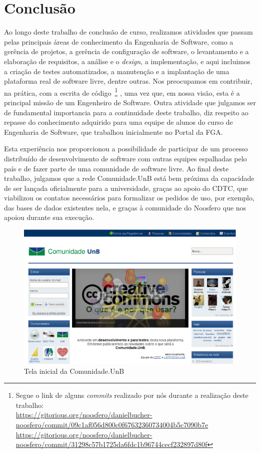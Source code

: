 \chapter{Conclusão}
\label{cap:conclusao}

Ao longo deste trabalho de conclusão de curso, realizamos atividades que passam
pelas principais áreas de conhecimento da Engenharia de Software, como a
gerência de projetos, a gerência de configuração de software,
o levantamento e a elaboração de requisitos, a análise e o \textit{design},
a implementação, e aqui incluimos a criação de testes automatizados,
a manutenção e a implantação de uma plataforma real de software livre, dentre
outras.
%
Nos preocupamos em contribuir, na prática, com a escrita de código~\footnote{%
Segue o link de alguns \textit{commits} realizado por nós durante a realização
deste trabalho: \\
\url{https://gitorious.org/noosfero/danielbucher-noosfero/commit/09c1af056d800c0f67632360734004b5c7090b7e}\\
\url{https://gitorious.org/noosfero/danielbucher-noosfero/commit/31298c57b1725da6fdc1b96744cecf232897d80f}}
, uma vez que, em nossa visão, esta é a principal missão de um Engenheiro de
Software.
%
Outra atividade que julgamos ser de fundamental importancia para a continuidade
deste trabalho, diz respeito ao repasse do conhecimento adquirido para uma
equipe de alunos do curso de Engenharia de Software, que trabalhou inicialmente
no Portal da FGA.

Esta experiência nos proporcionou a possibilidade de participar de um processo
distribuído de desenvolvimento de software com outras equipes espalhadas pelo
país e de fazer parte de uma comunidade de software livre.
%
Ao final deste trabalho, julgamos que a rede Comunidade.UnB está bem próxima
da capacidade de ser lançada oficialmente para a universidade, graças ao
apoio do CDTC, que viabilizou os contatos necessários para formalizar os
pedidos de uso, por exemplo, das bases de dados existentes nela, e graças
à comunidade do Noosfero que nos apoiou durante sua execução.

\begin{figure}[h!]
	\centering
	\includegraphics[keepaspectratio=true,scale=0.45]
	  {figuras/comunidade-unb.eps}
	\caption{Tela inicial da Comunidade.UnB}
	\label{homepage:comunidade.unb}
\end{figure}

